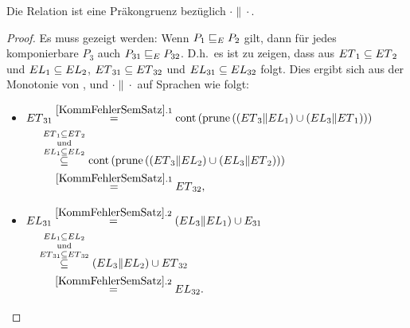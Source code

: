 \begin{Kor}
  \label{KommPraekonKor}
  Die Relation \ERel{} ist eine Präkongruenz bezüglich $\cdot\|\cdot$.
\end{Kor}
\begin{proof}
  Es muss gezeigt werden: Wenn $P_1 \sqsubseteq  _E P_2$ gilt, dann für jedes
  komponierbare $P_3$ auch $P_{31} \sqsubseteq  _E P_{32}$. D.h.\ es ist zu zeigen,
  dass aus $ET{}_1\subseteq ET{}_2$ und $EL{}_1\subseteq EL{}_2$,
  $ET{}_{31}\subseteq ET{}_{32}$ und $EL{}_{31}\subseteq
  EL{}_{32}$ folgt. Dies ergibt sich aus der Monotonie von \cont{},
  \prune{} und $\cdot \|\cdot$ auf Sprachen wie folgt:\\
  \begin{itemize}
    \item $\begin{aligned}[t]
        \ET{}_{31} &\overset{\ref{KommFehlerSemSatz}.1}{=}
      \cont{}\left(\prune{}\left(\left(\ET{}_3\|\EL{}_1\right)\cup
          \left(\EL{}_3\|\ET{}_1\right)\right)\right)\\
      &\hspace{-0.4cm}\overset{\ET{}_1\subseteq
    \ET{}_2}{\overset{\mathrm{und}}{\overset{\EL{}_1\subseteq \EL{}_2}{\subseteq}}}
    \cont{}\left(\prune{}\left(\left(\ET{}_3\|\EL{}_2\right)\cup
        \left(\EL{}_3\|\ET{}_2\right)\right)\right)\\
    &\overset{\ref{KommFehlerSemSatz}.1}{=} \ET{}_{32},
    \end{aligned}$
    \item $\begin{aligned}[t]
        \EL{}_{31} &\overset{\ref{KommFehlerSemSatz}.2}{=}
        (\EL{}_3\|\EL{}_1)\cup E_{31}\\
        &\hspace{-0.5cm}\overset{\EL{}_1\subseteq
      \EL{}_2}{\overset{\mathrm{und}}{\overset{\ET{}_{31}\subseteq
      \ET{}_{32}}{\subseteq}}} (\EL{}_3\|\EL{}_2)\cup \ET{}_{32}\\
      &\overset{\ref{KommFehlerSemSatz}.2}{=} \EL{}_{32}.
    \end{aligned}$
  \end{itemize}
\end{proof}

